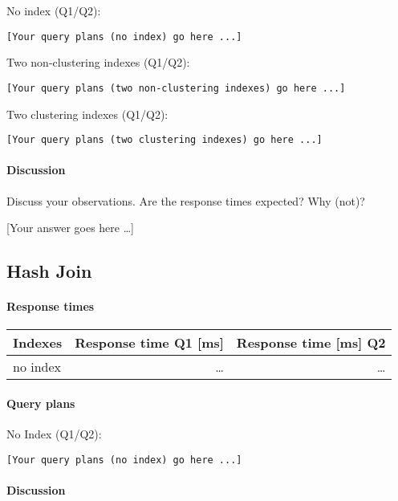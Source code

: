 \documentclass[11pt]{scrartcl}
\newcommand{\youranswerhere}{[Your answer goes here \ldots]}
\begin{document}
No index (Q1/Q2):

{\small
\parskip0pt\begin{verbatim}
[Your query plans (no index) go here ...]
\end{verbatim}}

Two non-clustering indexes (Q1/Q2):
{\small
\parskip0pt\begin{verbatim}
[Your query plans (two non-clustering indexes) go here ...]
\end{verbatim}}

Two clustering indexes  (Q1/Q2):
{\small
\parskip0pt\begin{verbatim}
[Your query plans (two clustering indexes) go here ...]
\end{verbatim}}

\paragraph{Discussion}

Discuss your observations. Are the response times expected? Why (not)?

\youranswerhere{}

\subsection*{Hash Join}

\paragraph{Response times}\mbox{}

\begin{table}[H]
  \centering
  \begin{tabular}{l|r|r}
    Indexes & Response time Q1 [ms] & Response time [ms] Q2 \tabularnewline
    \hline
    no index & \ldots & \ldots \tabularnewline
  \end{tabular}
\end{table}

\paragraph{Query plans}\mbox{}

No Index (Q1/Q2):

{\small
\parskip0pt\begin{verbatim}
[Your query plans (no index) go here ...]
\end{verbatim}}

\paragraph{Discussion}
\end{document}
